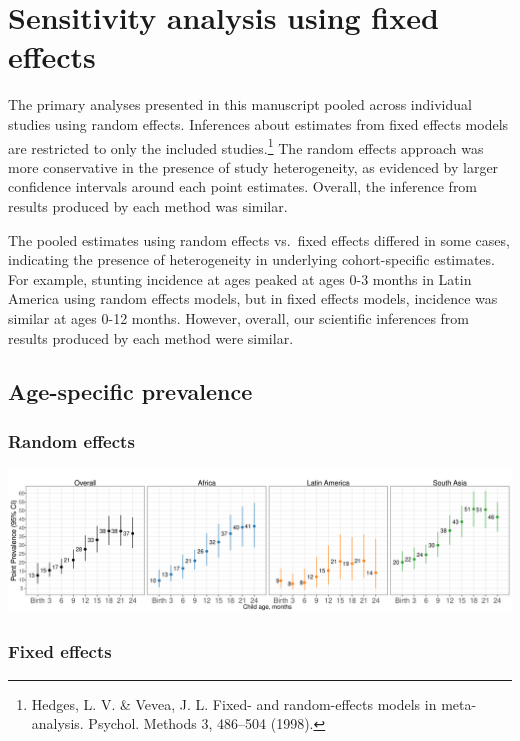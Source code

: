 \documentclass[
  9pt,
]{book}
\begin{document}
\hypertarget{fixed-effects}{%
\chapter{Sensitivity analysis using fixed effects}\label{fixed-effects}}

The primary analyses presented in this manuscript pooled across individual studies using random effects. Inferences about estimates from fixed effects models are restricted to only the included studies.\footnote{Hedges, L. V. \& Vevea, J. L. Fixed- and random-effects models in meta-analysis. Psychol. Methods 3, 486--504 (1998).} The random effects approach was more conservative in the presence of study heterogeneity, as evidenced by larger confidence intervals around each point estimates. Overall, the inference from results produced by each method was similar.

The pooled estimates using random effects vs.~fixed effects differed in some cases, indicating the presence of heterogeneity in underlying cohort-specific estimates. For example, stunting incidence at ages peaked at ages 0-3 months in Latin America using random effects models, but in fixed effects models, incidence was similar at ages 0-12 months. However, overall, our scientific inferences from results produced by each method were similar.

\hypertarget{age-specific-prevalence-2}{%
\section{Age-specific prevalence}\label{age-specific-prevalence-2}}

\hypertarget{random-effects}{%
\subsection{Random effects}\label{random-effects}}

\includegraphics[width=58.33in]{figures//stunting/fig-stunt-2-prev-overall_region--allage-primary}

\hypertarget{fixed-effects-1}{%
\subsection{Fixed effects}\label{fixed-effects-1}}
\end{document}

